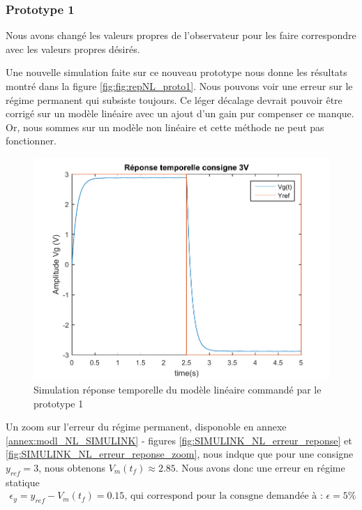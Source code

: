 \subsubsection{Prototype 1}
Nous avons changé les valeurs propres de l'observateur pour les faire correspondre avec les valeurs propres désirés. 		
			
		Une nouvelle simulation faite sur ce nouveau prototype nous donne les résultats montré dans la figure \ref{fig:fig:repNL_proto1}. Nous pouvons voir une erreur sur le régime permanent qui subsiste toujours. Ce léger décalage devrait pouvoir être corrigé sur un modèle linéaire avec un ajout d'un gain pur compenser ce manque. Or, nous sommes sur un modèle non linéaire et cette méthode ne peut pas fonctionner.
\begin{figure}[!ht]
\centering
\includegraphics[width= .8\textwidth]{./IV/images/repNL_proto1.pdf}
\caption{Simulation réponse temporelle du modèle linéaire commandé par le prototype 1\label{fig:repNL_proto1} }
\end{figure}
		Un zoom sur l'erreur du régime permanent, disponoble en annexe \ref{annex:modl_NL_SIMULINK} - figures \ref{fig:SIMULINK_NL_erreur_reponse} et \ref{fig:SIMULINK_NL_erreur_reponse_zoom}, nous indque que pour une consigne $y_{ref} = 3$, nous obtenons $V_m(t_f)\approx 2.85$. Nous avons donc une erreur en régime statique \begin{align*}
\epsilon_y = y_{ref}-V_m(t_f) = 0.15 \text{, qui correspond pour la consgne demandée à : } \epsilon = 5\%
\end{align*}
